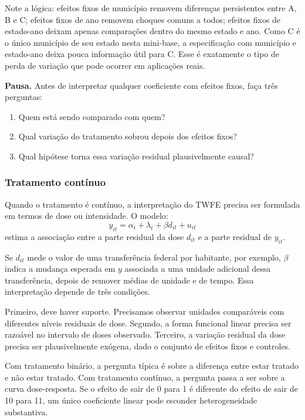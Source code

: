 \documentclass[
]{article}
\providecommand{\tightlist}{%
  \setlength{\itemsep}{0pt}\setlength{\parskip}{0pt}}
\begin{document}
Note a lógica: efeitos fixos de município removem diferenças persistentes entre A, B e C; efeitos fixos de ano removem choques comuns a todos; efeitos fixos de estado-ano deixam apenas comparações dentro do mesmo estado e ano. Como C é o único município de seu estado nesta mini-base, a especificação com município e estado-ano deixa pouca informação útil para C. Esse é exatamente o tipo de perda de variação que pode ocorrer em aplicações reais.

\textbf{Pausa.} Antes de interpretar qualquer coeficiente com efeitos fixos, faça três perguntas:

\begin{enumerate}
\def\labelenumi{\arabic{enumi}.}
\tightlist
\item
  Quem está sendo comparado com quem?
\item
  Qual variação do tratamento sobrou depois dos efeitos fixos?
\item
  Qual hipótese torna essa variação residual plausivelmente causal?
\end{enumerate}

\subsubsection{Tratamento contínuo}\label{tratamento-contuxednuo}

Quando o tratamento é contínuo, a interpretação do TWFE precisa ser formulada em termos de dose ou intensidade. O modelo:
\[
y_{it} = \alpha_i + \lambda_t + \beta d_{it} + u_{it}
\]
estima a associação entre a parte residual da dose \(d_{it}\) e a parte residual de \(y_{it}\).

Se \(d_{it}\) mede o valor de uma transferência federal por habitante, por exemplo, \(\beta\) indica a mudança esperada em \(y\) associada a uma unidade adicional dessa transferência, depois de remover médias de unidade e de tempo. Essa interpretação depende de três condições.

Primeiro, deve haver suporte. Precisamos observar unidades comparáveis com diferentes níveis residuais de dose. Segundo, a forma funcional linear precisa ser razoável no intervalo de doses observado. Terceiro, a variação residual da dose precisa ser plausivelmente exógena, dado o conjunto de efeitos fixos e controles.

Com tratamento binário, a pergunta típica é sobre a diferença entre estar tratado e não estar tratado. Com tratamento contínuo, a pergunta passa a ser sobre a curva dose-resposta. Se o efeito de sair de 0 para 1 é diferente do efeito de sair de 10 para 11, um único coeficiente linear pode esconder heterogeneidade substantiva.
\end{document}
